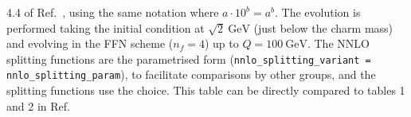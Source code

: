 \begin{table}[p]
{    4.4 of Ref.~\cite{Dittmar:2005ed}, using the same notation where
    $a\cdot10^{b} = a^b$. The evolution is performed taking the
    initial condition at $\sqrt{2}~\text{GeV}$ (just below the charm
    mass) and evolving in the FFN scheme ($n_f = 4$) up to
    $Q=100~\text{GeV}$.
    The NNLO splitting functions are the parametrised form
    (\texttt{nnlo\_splitting\_variant = nnlo\_splitting\_param}), to 
    facilitate comparisons by other groups, and the \ntlo splitting
    functions use the
     choice.
    This table can be directly compared to tables 1 and 2 in Ref.~\cite{Cooper-Sarkar:2024crx}}
  \label{tab:n3lo-evolve-nf4}
\end{table}


